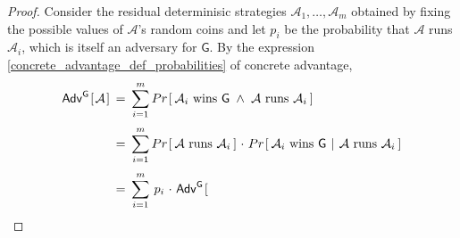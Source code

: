 \documentclass[psamsfonts, reqno]{amsart}
\theoremstyle{definition}
\theoremstyle{remark}
\numberwithin{equation}{section}
\begin{document}
\begin{proof}

Consider the residual determinisic strategies
$\mathcal{A}_1, \dots, \mathcal{A}_m$ obtained
by fixing the possible values of $\mathcal{A}$'s
random coins and let $p_i$ be the probability that
$\mathcal{A}$ runs $\mathcal{A}_i$,
which is itself an adversary for $\mathsf{G}$.
By the expression \eqref{concrete_advantage_def_probabilities}
of concrete advantage,
\vspace{0pt}
\begin{equation*}
\begin{split}
	\mathsf{Adv}
		^{\mathsf{G}}
		\hspace{1pt}
		[
			\hspace{1pt}
			\mathcal{A}
			\hspace{1pt}
		]
	\hspace{2pt}
	&=
	\hspace{2pt}
	\sum_{i=1}^m
	Pr\hspace{1pt}[
		\hspace{2pt}
		\mathcal{A}_i \textup{ wins } \mathsf{G}
		\hspace{3pt}
		\land
		\hspace{3pt}
		\mathcal{A} \textup{ runs } \mathcal{A}_i
		\hspace{2pt}
	]\\[3pt]
	&=
	\hspace{2pt}
	\sum_{i=1}^m
	Pr\hspace{1pt}[
		\hspace{2pt}
		\mathcal{A} \textup{ runs } \mathcal{A}_i
		\hspace{2pt}
	]
	\hspace{1pt}
	\cdot
	\hspace{1pt}
	Pr\hspace{1pt}[
		\hspace{2pt}
		\mathcal{A}_i \textup{ wins }
			\mathsf{G}
		\hspace{1pt}
		\mid
		\hspace{1pt}
		\mathcal{A} \textup{ runs } \mathcal{A}_i
		\hspace{2pt}
	]\\[3pt]
	&=
	\hspace{2pt}
	\sum_{i=1}^m
	\hspace{2pt}
	p_i
	\hspace{1pt}
	\cdot
	\hspace{1pt}
	\mathsf{Adv}
		^{\mathsf{G}}
		\hspace{1pt}
		[
			\hspace{1pt}

\end{split}
\end{equation*}
\end{proof}
\end{document}
